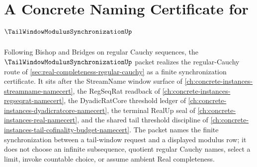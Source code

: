 \chapter{A Concrete Naming Certificate for $\TailWindowModulusSynchronizationUp$}
\label{ch:concrete-instances-tail-window-modulus-synchronization-namecert}

Following Bishop and Bridges on regular Cauchy sequences, the $\TailWindowModulusSynchronizationUp$ packet realizes the regular-Cauchy route of \autoref{sec:real-completeness-regular-cauchy} as a finite synchronization certificate. It sits after the StreamName window surface of \autoref{ch:concrete-instances-streamname-namecert}, the RegSeqRat readback of \autoref{ch:concrete-instances-regseqrat-namecert}, the DyadicRatCore threshold ledger of \autoref{ch:concrete-instances-dyadicratcore-namecert}, the terminal RealUp seal of \autoref{ch:concrete-instances-real-namecert}, and the shared tail threshold discipline of \autoref{ch:concrete-instances-tail-cofinality-budget-namecert}. The packet names the finite synchronization between a tail-window request and a displayed modulus row; it does not choose an infinite subsequence, quotient regular Cauchy names, select a limit, invoke countable choice, or assume ambient Real completeness.

